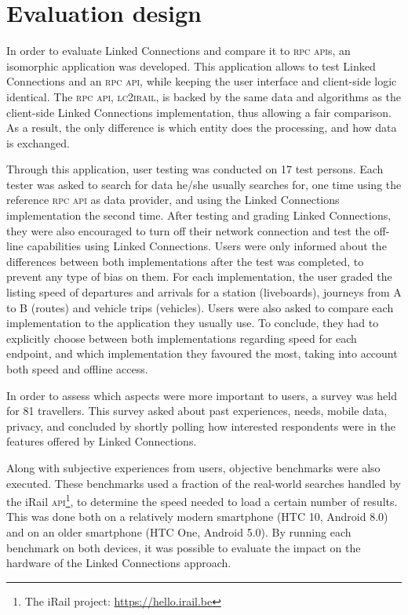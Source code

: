 \documentclass[twocolumn]{phdsymp} %
\begin{document}
\section{Evaluation design}

In order to evaluate Linked Connections and compare it to \textsc{rpc} \textsc{api}s, an isomorphic application was developed. This application allows to test Linked Connections and an \textsc{rpc} \textsc{api}, while keeping the user interface and client-side logic identical. The \textsc{rpc} \textsc{api}, \textsc{lc2irail}, is backed by the same data and algorithms as the client-side Linked Connections implementation, thus allowing a fair comparison. As a result, the only difference is which entity does the processing, and how data is exchanged.

Through this application, user testing was conducted on 17 test persons. Each tester was asked to search for data he/she usually searches for, one time using the reference \textsc{rpc} \textsc{api} as data provider, and using the Linked Connections implementation the second time. After testing and grading Linked Connections, they were also encouraged to turn off their network connection and test the off-line capabilities using Linked Connections. Users were only informed about the differences between both implementations after the test was completed, to prevent any type of bias on them. For each implementation, the user graded the listing speed of departures and arrivals for a station (liveboards), journeys from A to B (routes) and vehicle trips (vehicles). Users were also asked to compare each implementation to the application they usually use. To conclude, they had to explicitly choose between both implementations regarding speed for each endpoint, and which implementation they favoured the most, taking into account both speed and offline access.

In order to assess which aspects were more important to users, a survey was held for 81 travellers. This survey asked about past experiences, needs, mobile data, privacy, and concluded by shortly polling how interested respondents were in the features offered by Linked Connections.

Along with subjective experiences from users, objective benchmarks were also executed. These benchmarks used a fraction of the real-world searches handled by the iRail \textsc{api}\footnote{The iRail project: \url{https://hello.irail.be}}, to determine the speed needed to load a certain number of results. This was done both on a relatively modern smartphone (HTC 10, Android 8.0) and on an older smartphone (HTC One, Android 5.0). By running each benchmark on both devices, it was possible to evaluate the impact on the hardware of the Linked Connections approach.
\end{document}
